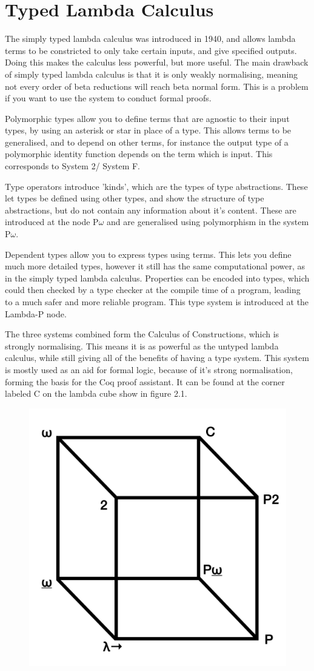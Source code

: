 \documentclass{l4proj}
\begin{document}
\section{Typed Lambda Calculus}

The simply typed lambda calculus was introduced in 1940, and allows lambda terms to be constricted to only take certain inputs, and give specified outputs.  Doing this makes the calculus less powerful, but more useful.  The main drawback of simply typed lambda calculus is that it is only weakly normalising, meaning not every order of beta reductions will reach beta normal form.  This is a problem if you want to use the system to conduct formal proofs.

Polymorphic types allow you to define terms that are agnostic to their input types, by using an asterisk or star in place of a type.  This allows terms to be generalised, and to depend on other terms, for instance the output type of a polymorphic identity function depends on the term which is input.  This corresponds to System 2/ System F.

Type operators introduce 'kinds', which are the types of type abstractions.  These let types be defined using other types, and show the structure of type abstractions, but do not contain any information about it's content.  These are introduced at the node P\underline{$\omega$} and are generalised using polymorphism in the system P$\omega$.

Dependent types allow you to express types using terms.  This lets you define much more detailed types, however it still has the same computational power, as in the simply typed lambda calculus.  Properties can be encoded into types, which could then checked by a type checker at the compile time of a program, leading to a much safer and more reliable program.  This type system is introduced at the Lambda-P node.

The three systems combined form the Calculus of Constructions, which is strongly normalising.  This means it is as powerful as the untyped lambda calculus, while still giving all of the benefits of having a type system.  This system is mostly used as an aid for formal logic, because of it's strong normalisation, forming the basis for the Coq proof assistant.  It can be found at the corner labeled C on the lambda cube show in figure 2.1.

\begin{figure}[h!]
    \centering
    \includegraphics[width=0.5\linewidth]{dissertation/images/cube.png}
    \caption{}
    \label{fig:enter-label}
\end{figure}
\end{document}
